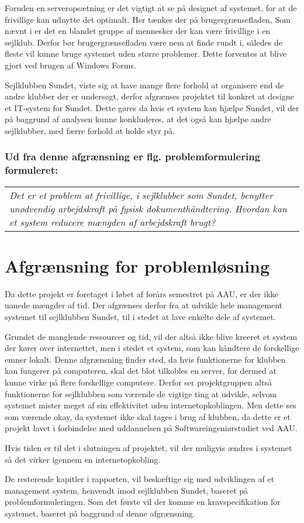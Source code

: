 Foruden en serveropsætning er det vigtigt at se på designet af systemet, for at de frivillige kan udnytte det
optimalt. Her tænkes der på brugergrænsefladen. Som nævnt i 
er det en blandet gruppe af mennesker der kan være frivillige i en sejlklub. Derfor bør brugergrænsefladen
være nem at finde rundt i, således de fleste vil kunne bruge systemet uden større problemer. Dette
forventes at blive gjort ved brugen af Windows Forms.

Sejlklubben Sundet, viste sig at have mange flere forhold at organisere end de andre klubber der er undersøgt,
derfor afgrænses projektet til konkret at designe et IT-system for Sundet. Dette gøres da hvis et system kan
hjælpe Sundet, vil der på baggrund af analysen kunne konkluderes, at det også kan hjælpe andre sejlklubber,
med færre forhold at holde styr på.

\subsubsection*{Ud fra denne afgrænsning er flg. problemformulering formuleret:}

\begin{center}
  \begin{tabular}{|p{14cm}|}
    \textit{Det er et problem at frivillige, i sejlklubber som Sundet, benytter unødvendig arbejdskraft på
    fysisk dokumenthåndtering. Hvordan kan et system reducere mængden af arbejdskraft brugt? }
  \end{tabular}
\end{center}


\section{Afgrænsning for problemløsning}

Da dette projekt er foretaget i løbet af forårs semestret på AAU, er der ikke uanede mængder af tid. Der
afgrænses derfor fra at udvikle hele management systemet til sejlklubben Sundet, til i stedet at lave enkelte
dele af systemet.

Grundet de manglende ressourcer og tid, vil der altså ikke blive kreeret et system der kører over internettet,
men i stedet et system, som kan håndtere de forskellige emner lokalt. Denne afgrænsning finder sted, da hvis
funktionerne for klubben kan fungerer på computeren, skal det blot tilkobles en server, for dermed at kunne
virke på flere forskellige computere. Derfor ser projektgruppen altså funktionerne for sejlklubben som værende
de vigtige ting at udvikle, selvom systemet mister meget af sin effektivitet uden internetopkoblingen. Men
dette ses som værende okay, da systemet ikke skal tages i brug af klubben, da dette er et projekt lavet i
forbindelse med uddannelsen på Softwareingeniørstudiet ved AAU.

Hvis tiden er til det i slutningen af projektet, vil der muligvis ændres i systemet så det virker igennem en
internetopkobling.

De resterende kapitler i rapporten, vil beskæftige sig med udviklingen af et management system, henvendt imod
sejlklubben Sundet, baseret på problemformuleringen. Som det første vil der komme en kravspecifikation for
systemet, baseret på baggrund af denne afgrænsning.
